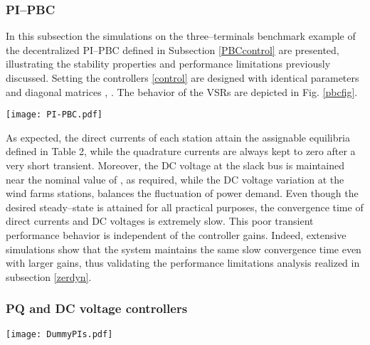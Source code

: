 \documentclass[5p,twocolumn]{elsarticle}
\numberwithin{equation}{section}
\begin{document}
\subsubsection{PI--PBC}
\label{simpipbc}
In this subsection the simulations on the three--terminals benchmark example of the decentralized PI--PBC defined in Subsection \ref{PBCcontrol} are presented, illustrating the stability properties and performance limitations previously discussed. Setting   the controllers \eqref{control} are designed with identical parameters and diagonal matrices , . The behavior of the VSRs are depicted in Fig. \ref{pbcfig}.
\begin{figure*}[ht]
 \centering
 \texttt{[image: PI-PBC.pdf]}
\caption{{Responses of VSRs variables under the decentralized PI--PBC.}}
 \label{pbcfig}
\end{figure*}

As expected, the direct currents of each station attain the assignable equilibria defined in Table 2, while the quadrature currents are always kept to zero after a very short transient. Moreover, the DC voltage at the slack bus is maintained near the nominal value of  , as required, while the DC voltage variation at the wind farms stations, balances the fluctuation of power demand. Even though the desired steady--state is attained for all practical purposes, the convergence time of direct currents and DC voltages is extremely slow. This poor transient performance behavior is independent of the controller gains. Indeed, extensive simulations show that the system maintains the same slow convergence time even with larger gains, thus validating the performance limitations analysis realized in subsection \ref{zerdyn}.


\subsubsection{PQ and DC voltage controllers}


\begin{figure*}[ht]
 \centering
 \texttt{[image: DummyPIs.pdf]}
\caption{{Responses of VSRs variables under the decentralized PQ and DC voltage controllers.}}
 \label{PIfig}
\end{figure*}
\end{document}
